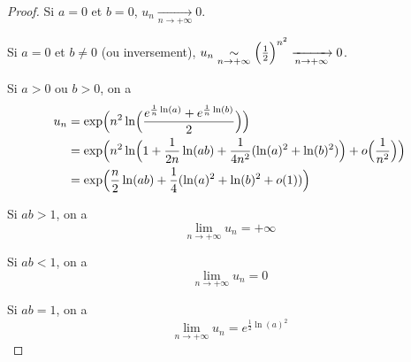 \documentclass[12pt]{article}
\begin{document}
\begin{proof}
	Si $a=0$ et $b=0$, $u_{n}\xrightarrow[n\to+\infty]{}0$.

	Si $a=0$ et $b\neq0$ (ou inversement), $u_{n}\underset{n\to+\infty}{\sim}\Bigl(\frac{1}{2}\Bigr)^{n^{2}}\xrightarrow[n\to+\infty]{}0$.

	Si $a>0$ ou $b>0$, on a
	\begin{align}
		u_{n}
		&=\exp\Bigl(n^{2}\ln\Bigl(\frac{e^{\frac{1}{n}\ln(a)}+e^{\frac{1}{n}\ln(b)}}{2}\Bigr)\Bigr)\\
		&=\exp\Bigl(n^{2}\ln\Bigl(1+\frac{1}{2n}\ln(ab)+\frac{1}{4n^2}(\ln(a)^{2}+\ln(b)^{2})\Bigr)+o\Bigl(\frac{1}{n^{2}}\Bigr)\Bigr)\\
		&=\exp\Bigl(\frac{n}{2}\ln(ab)+\frac{1}{4}(\ln(a)^{2}+\ln(b)^{2}+o(1))\Bigr)
	\end{align}

	Si $ab>1$, on a 
	\begin{equation}\boxed{\lim\limits_{n\to+\infty} u_{n}=+\infty}\end{equation}
	
	Si $ab<1$, on a 
	\begin{equation}\boxed{\lim\limits_{n\to+\infty} u_{n}=0}\end{equation}

	Si $ab=1$, on a 
	\begin{equation}\boxed{\lim\limits_{n\to+\infty} u_{n}=e^{\frac{1}{2}\ln(a)^{2}}}\end{equation}
\end{proof}
\end{document}
